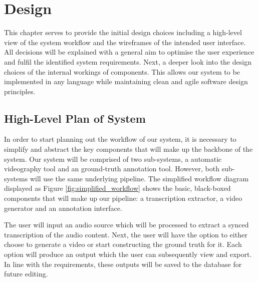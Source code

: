 \documentclass{l4proj}
\begin{document}


\chapter{Design}
This chapter serves to provide the initial design choices including a high-level view of the system workflow and the wireframes of the intended user interface. All decisions will be explained with a general aim to optimise the user experience and fulfil the identified system requirements. Next, a deeper look into the design choices of the internal workings of components. This allows our system to be implemented in any language while maintaining clean and agile software design principles. 

\section{High-Level Plan of System}
In order to start planning out the workflow of our system, it is necessary to simplify and abstract the key components that will make up the backbone of the system. Our system will be comprised of two sub-systems, a automatic videography tool and an ground-truth annotation tool. However, both sub-systems will use the same underlying pipeline. The simplified workflow diagram displayed as Figure \ref{fig:simplified_workflow} shows the basic, black-boxed components that will make up our pipeline: a transcription extractor, a video generator and an annotation interface.

The user will input an audio source which will be processed to extract a synced transcription of the audio content. Next, the user will have the option to either choose to generate a video or start constructing the ground truth for it. Each option will produce an output which the user can subsequently view and export. In line with the requirements, these outputs will be saved to the database for future editing.
\end{document}
